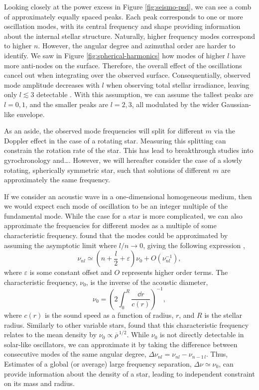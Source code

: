 Looking closely at the power excess in Figure \ref{fig:seismo-psd}, we can see a comb of approximately equally spaced peaks. Each peak corresponds to one or more oscillation modes, with its central frequency and shape providing information about the internal stellar structure. Naturally, higher frequency modes correspond to higher \(n\). However, the angular degree and azimuthal order are harder to identify. We saw in Figure \ref{fig:spherical-harmonics} how modes of higher \(l\) have more anti-nodes on the surface. Therefore, the overall effect of the oscillations cancel out when integrating over the observed surface. Consequentially, observed mode amplitude decreases with \(l\) when observing total stellar irradiance, leaving only \(l \lesssim 3\) detectable \needcite. With this assumption, we can assume the tallest peaks are \(l=0,1\), and the smaller peaks are \(l=2,3\), all modulated by the wider Gaussian-like envelope.

As an aside, the observed mode frequencies will split for different \(m\) via the Doppler effect in the case of a rotating star. Measuring this splitting can constrain the rotation rate of the star. This has lead to breakthrough studies into gyrochronology and\dots \citep[e.g.][]{Hall.Davies.ea2021}. However, we will hereafter consider the case of a slowly rotating, spherically symmetric star, such that solutions of different \(m\) are approximately the same frequency.

If we consider an acoustic wave in a one-dimensional homogeneous medium, then we would expect each mode of oscillation to be an integer multiple of the fundamental mode. While the case for a star is more complicated, we can also approximate the frequencies for different modes as a multiple of some characteristic frequency. \citet{Tassoul1980} found that the modes could be approximated by assuming the asymptotic limit where \(l/n \rightarrow 0\), giving the following expression \citep[cf.][]{Gough1986},
%
\begin{equation}
    \nu_{nl} \simeq \left(n + \frac{l}{2} + \varepsilon\right) \nu_0 + O(\nu_{nl}^{-1}), \label{eq:asy}
\end{equation}
%
where \(\varepsilon\) is some constant offset and \(O\) represents higher order terms. The characteristic frequency, \(\nu_0\), is the inverse of the acoustic diameter,
%
\begin{equation}
    \nu_0 = \left(2 \int_{0}^{R} \frac{\dd r}{c(r)}\right)^{-1},
\end{equation}
%
where \(c(r)\) is the sound speed as a function of radius, \(r\), and \(R\) is the stellar radius. Similarly to other variable stars, \citet{Ulrich1986} found that this characteristic frequency relates to the mean density by \(\nu_0 \propto \overline{\rho}^{\,1/2}\). While \(\nu_0\) is not directly detectable in solar-like oscillators, we can approximate it by taking the difference between consecutive modes of the same angular degree, \(\Delta\nu_{nl} = \nu_{nl} - \nu_{n-1\,l}\). Thus, Estimates of a global (or average) large frequency separation, \(\Delta\nu \simeq \nu_0\), can provide information about the density of a star, leading to independent constraint on its mass and radius.

